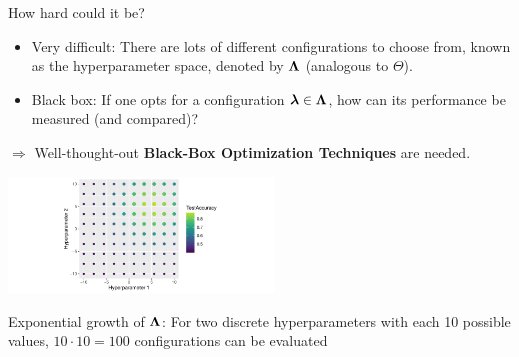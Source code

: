\documentclass[11pt,compress,t,notes=noshow, xcolor=table]{beamer}
\begin{document}
\begin{vbframe}{How hard could it be?}
\begin{itemize}
\item \small Very difficult: There are lots of different configurations to choose from, known as the hyperparameter space, denoted by $\bm{\Lambda}$ (analogous to $\Theta$).
\item \small Black box: If one opts for a configuration $\bm{\lambda} \in \bm{\Lambda}$, how can its performance be measured (and compared)?
\end{itemize}

$\Rightarrow$ Well-thought-out \textbf{Black-Box Optimization Techniques} are needed.

\begin{center}
\vspace{2em}
\includegraphics[width=200pt]{figure/cart_tuning_balgos_1.pdf}
\end{center}

\begin{center}
\scriptsize Exponential growth of $\bm{\Lambda}$: For two discrete hyperparameters with each 10 possible values, $10 \cdot 10 = 100$ configurations can be evaluated
\end{center}

\end{vbframe}
\end{document}
